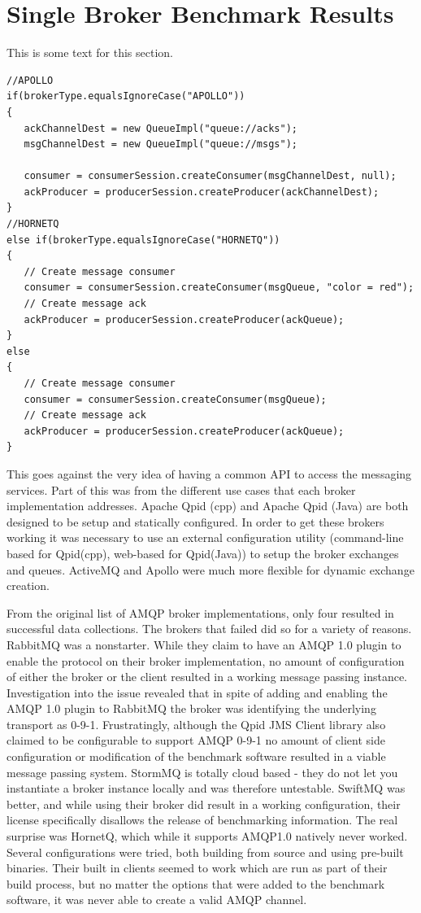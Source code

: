 \documentclass{thesis}
\begin{document}
\section{Single Broker Benchmark Results}
This is some text for this section.

\begin{lstlisting}
//APOLLO
if(brokerType.equalsIgnoreCase("APOLLO"))
{
   ackChannelDest = new QueueImpl("queue://acks");
   msgChannelDest = new QueueImpl("queue://msgs");
        	
   consumer = consumerSession.createConsumer(msgChannelDest, null);
   ackProducer = producerSession.createProducer(ackChannelDest);
}
//HORNETQ
else if(brokerType.equalsIgnoreCase("HORNETQ"))
{
   // Create message consumer
   consumer = consumerSession.createConsumer(msgQueue, "color = red");
   // Create message ack
   ackProducer = producerSession.createProducer(ackQueue);
}
else
{
   // Create message consumer
   consumer = consumerSession.createConsumer(msgQueue);
   // Create message ack
   ackProducer = producerSession.createProducer(ackQueue);
}
\end{lstlisting}

This goes against the very idea of having a common API to access the messaging services.  Part of this was from the different use cases that each broker implementation addresses.  Apache Qpid (cpp) and Apache Qpid (Java) are both designed to be setup and statically configured.  In order to get these brokers working it was necessary to use an external configuration utility (command-line based for Qpid(cpp), web-based for Qpid(Java)) to setup the broker exchanges and queues.  ActiveMQ and Apollo were much more flexible for dynamic exchange creation.  

From the original list of AMQP broker implementations, only four resulted in successful data collections.  The brokers that failed did so for a variety of reasons.  RabbitMQ was a nonstarter.  While they claim to have an AMQP 1.0 plugin to enable the protocol on their broker implementation, no amount of configuration of either the broker or the client resulted in a working message passing instance.  Investigation into the issue revealed that in spite of adding and enabling the AMQP 1.0 plugin to RabbitMQ the broker was identifying the underlying transport as 0-9-1.  Frustratingly, although the Qpid JMS Client library also claimed to be configurable to support AMQP 0-9-1 no amount of client side configuration or modification of the benchmark software resulted in a viable message passing system.  StormMQ is totally cloud based - they do not let you instantiate a broker instance locally and was therefore untestable.  SwiftMQ was better, and while using their broker did result in a working configuration, their license specifically disallows the release of benchmarking information.  The real surprise was HornetQ, which while it supports AMQP1.0 natively never worked.  Several configurations were tried, both building from source and using pre-built binaries.  Their built in clients seemed to work which are run as part of their build process, but no matter the options that were added to the benchmark software, it was never able to create a valid AMQP channel.
\end{document}
